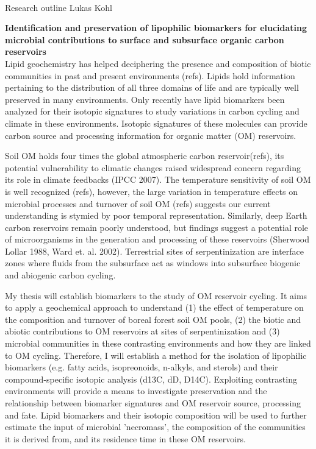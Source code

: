 \documentclass[10pt]{article}
\date{}
\begin{document}


\begin{flushleft}
\\Research outline Lukas Kohl

{\Large
\textbf{Identification and preservation of lipophilic biomarkers for elucidating microbial contributions to surface and subsurface organic carbon reservoirs}
}
\\

Lipid geochemistry has helped deciphering the presence and composition of biotic communities in past and present environments (refs). Lipids hold information pertaining to the distribution of all three domains of life and are typically well preserved in many environments. Only recently have lipid biomarkers been analyzed for their isotopic signatures to study variations in carbon cycling and climate in these environments.  Isotopic signatures of these molecules can provide carbon source and processing information for organic matter (OM) reservoirs.

Soil OM holds  four times the global atmospheric carbon reservoir(refs), its potential vulnerability to climatic changes raised widespread concern regarding its role in climate feedbacks (IPCC 2007). The temperature sensitivity of soil OM is well recognized (refs), however, the large variation in temperature effects on microbial processes and turnover of soil OM (refs) suggests our current understanding is stymied by poor temporal representation. Similarly, deep Earth carbon reservoirs remain poorly understood, but findings suggest a potential role of microorganisms in the generation and processing of these reservoirs (Sherwood Lollar 1988, Ward et. al. 2002). Terrestrial sites of serpentinization are interface zones where fluids from the subsurface act as windows into subsurface biogenic and abiogenic carbon cycling.

My thesis will establish biomarkers to the study of OM reservoir cycling. It aims to apply a geochemical approach to understand (1) the effect of temperature on the composition and turnover of boreal forest soil OM pools, (2) the biotic and abiotic contributions to OM reservoirs at sites of serpentinization and (3) microbial communities in these contrasting environments and how they are linked to OM cycling. Therefore, I will establish a method for the isolation of lipophilic biomarkers (e.g. fatty acids, isopreonoids, n-alkyls, and sterols) and their compound-specific isotopic analysis (d13C, dD, D14C). Exploiting contrasting environments will provide a means to investigate preservation and the relationship between biomarker signatures and OM reservoir source, processing and fate. Lipid biomarkers and their isotopic composition will be used to further estimate the input of microbial 'necromass', the composition of the communities it is derived from, and its residence time in these OM reservoirs.



\end{flushleft}
\end{document}
